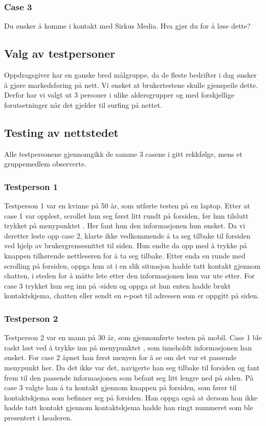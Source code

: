 \subsubsection{Case 3}
Du ønsker å komme i kontakt med Sirkus Media. Hva gjør du for å løse dette?

\subsection{Valg av testpersoner }
Oppdragsgiver har en ganske bred målgruppe, da de fleste bedrifter i dag ønsker å gjøre markedsføring på nett. Vi ønsket at brukertestene skulle gjenspeile dette. Derfor har vi valgt ut 3 personer i ulike aldersgrupper og med forskjellige forutsetninger når det gjelder til surfing på nettet.

\subsection{Testing av nettstedet}
Alle testpersonene gjennomgikk de samme 3 casene i gitt rekkfølge, mens et gruppemedlem observerte.

\subsubsection{Testperson 1}
Testperson 1 var en kvinne på 50 år, som utførte testen på en laptop. Etter at case 1 var opplest, scrollet hun seg først litt rundt på forsiden, før hun tilslutt trykket på menypunktet . Her fant hun den informasjonen hun ønsket. Da vi deretter leste opp case 2, klarte ikke vedkommende å ta seg tilbake til forsiden ved hjelp av brukergrensesnittet til siden. Hun endte da opp med å trykke på knappen tilhørende nettleseren for å ta seg tilbake. Etter enda en runde med scrolling på forsiden, oppga hun at i en slik situasjon hadde tatt kontakt gjennom chatten, i steden for å måtte lete etter den informasjonen hun var ute etter. For case 3 trykket hun seg inn på -siden og oppga at hun enten hadde brukt kontaktskjema, chatten eller sendt en e-post til adressen som er oppgitt på siden.

\subsubsection{Testperson 2}
Testperson 2 var en mann på 30 år, som gjennomførte testen på mobil. Case 1 ble raskt løst ved å trykke inn på menypunktet , som inneholdt informasjonen han ønsket. For case 2 åpnet han først menyen for å se om det var et passende menypunkt her. Da det ikke var det, navigerte han seg tilbake til forsiden og fant frem til den passende informasjonen som befant seg litt lengre ned på siden. På case 3 valgte han å ta kontakt gjennom knappen på forsiden, som fører til kontaktskjema som befinner seg på forsiden. Han oppga også at dersom han ikke hadde tatt kontakt gjennom kontaktskjema hadde han ringt nummeret som ble presentert i headeren. 

